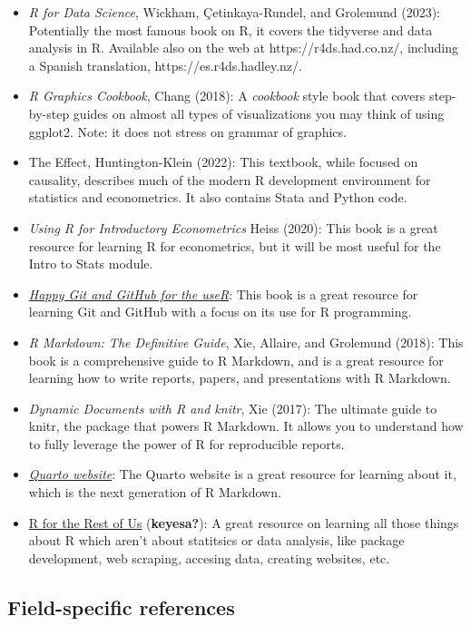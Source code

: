 \documentclass[
  letterpaper,
  DIV=11,
  numbers=noendperiod]{scrartcl}
\begin{document}
\begin{itemize}
\item
  \emph{R for Data Science}, Wickham, Çetinkaya-Rundel, and Grolemund
  (2023): Potentially the most famous book on R, it covers the tidyverse
  and data analysis in R. Available also on the web at
  https://r4ds.had.co.nz/, including a Spanish translation,
  https://es.r4ds.hadley.nz/.
\item
  \emph{R Graphics Cookbook}, Chang (2018): A \emph{cookbook} style book
  that covers step-by-step guides on almost all types of visualizations
  you may think of using ggplot2. Note: it does not stress on grammar of
  graphics.
\item
  The Effect, Huntington-Klein (2022): This textbook, while focused on
  causality, describes much of the modern R development environment for
  statistics and econometrics. It also contains Stata and Python code.
\item
  \emph{Using R for Introductory Econometrics} Heiss (2020): This book
  is a great resource for learning R for econometrics, but it will be
  most useful for the Intro to Stats module.
\item
  \href{https://happygitwithr.com/}{\emph{Happy Git and GitHub for the
  useR}}: This book is a great resource for learning Git and GitHub with
  a focus on its use for R programming.
\item
  \emph{R Markdown: The Definitive Guide}, Xie, Allaire, and Grolemund
  (2018): This book is a comprehensive guide to R Markdown, and is a
  great resource for learning how to write reports, papers, and
  presentations with R Markdown.
\item
  \emph{Dynamic Documents with R and knitr}, Xie (2017): The ultimate
  guide to knitr, the package that powers R Markdown. It allows you to
  understand how to fully leverage the power of R for reproducible
  reports.
\item
  \href{https://quarto.org/}{\emph{Quarto website}}: The Quarto website
  is a great resource for learning about it, which is the next
  generation of R Markdown.
\item
  \href{https://book.rfortherestofus.com/}{R for the Rest of Us}
  (\textbf{keyesa?}): A great resource on learning all those things
  about R which aren't about statitsics or data analysis, like package
  development, web scraping, accesing data, creating websites, etc.
\end{itemize}

\subsection{Field-specific references}\label{field-specific-references}
\end{document}
